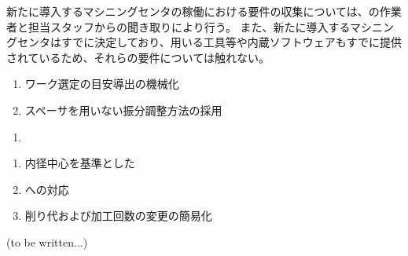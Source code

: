 

新たに導入するマシニングセンタの稼働における要件の収集については、\MMC の作業者と担当スタッフからの聞き取りにより行う。
また、新たに導入するマシニングセンタはすでに決定しており、用いる工具等や内蔵ソフトウェアもすでに提供されているため、それらの要件については触れない。



\begin{enumerate}[label=\sarrow]
\item ワーク\FixtureBolt 選定の目安導出の機械化
\item スペーサを用いない振分調整方法の採用
\end{enumerate}



\begin{enumerate}[label=\sarrow]
\item
\end{enumerate}



\begin{enumerate}[label=\sarrow]
\item 内径中心を基準とした\EndFacecutMilling
\item \ODCornerR への対応
\item {}削り代および加工回数の変更の簡易化
\end{enumerate}



(to be written...)



